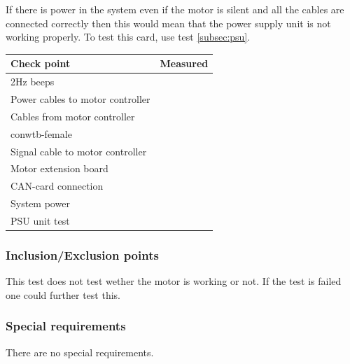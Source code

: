 \documentclass[10pt,a4paper]{article}
\begin{document}
If there is power in the system even if the motor is silent and all the cables are connected correctly then this would mean that the power supply unit is not working properly. To test this card, use test \ref{subsec:psu}.

\begin{tabular}{| l | c |}
\hline
Check point & Measured \\ \hline
2Hz beeps &  \\ \hline
Power cables to motor controller &  \\ \hline
Cables from motor controller & \\ \hline
conwtb-female & \\ \hline
Signal cable to motor controller & \\ \hline
Motor extension board & \\ \hline
CAN-card connection & \\ \hline
System power & \\ \hline
PSU unit test & \\ \hline
\end{tabular}
\subsubsection*{Inclusion/Exclusion points}
This test does not test wether the motor is working or not. If the test is failed one could further test this.  
\subsubsection*{Special requirements}
There are no special requirements. 
\end{document}
